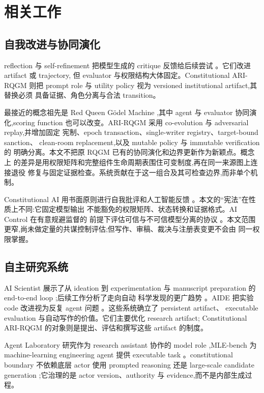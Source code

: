 \section{相关工作}\label{sec:related}

\subsection{自我改进与协同演化}\label{sec:related:treesearch}

reflection 与 self-refinement 把模型生成的 critique 反馈给后续尝试
\cite{madaan2023self,shinn2023reflexion}。它们改进 artifact 或 trajectory,
但 evaluator 与权限结构大体固定。Constitutional ARI-RQGM 则把 prompt
role 与 utility policy 视为 versioned institutional artifact,其替换必须
具备证据、角色分离与合法 transition。

最接近的概念祖先是 Red Queen G\"odel Machine
\cite{iacob2026red},其中 agent 与 evaluator 协同演化,scoring function
也可以改变。ARI-RQGM 采用 co-evolution 与 adversarial replay,并增加固定
宪制、epoch transaction、single-writer registry、target-bound sanction、
clean-room replacement,以及 mutable policy 与 immutable verification 的
明确分离。本文不把原 RQGM 已有的协同演化和边界更新作为新颖点。概念上
的差异是用权限矩阵和完整组件生命周期表围住可变制度,再在同一来源图上连接退役
修复与固定证据检查。系统贡献在于这一组合及其可检查边界,而非单个机制。

Constitutional AI 用书面原则进行自我批评和人工智能反馈
\cite{bai2022constitutional}。本文的“宪法”在性质上不同:它固定模型输出
不能豁免的权限矩阵、状态转换和证据格式。AI Control 在有意规避监督的
前提下评估可信与不可信模型分离的协议 \cite{greenblatt2023ai}。本文范围
更窄,尚未做定量的共谋控制评估;但写作、审稿、裁决与注册表变更不会由
同一权限掌握。

\subsection{自主研究系统}\label{sec:related:autonomous}

AI Scientist 展示了从 ideation 到 experimentation 与 manuscript
preparation 的 end-to-end loop \cite{lu2024ai};后续工作分析了走向自动
科学发现的更广趋势 \cite{lu2026towards}。AIDE 把实验 code 改进视为反复
agent 问题 \cite{jiang2025aide}。这些系统确立了 persistent artifact、
executable evaluation 与自动写作的价值。它们主要优化 research artifact;
Constitutional ARI-RQGM 的对象则是提出、评估和撰写这些 artifact 的制度。

Agent Laboratory 研究作为 research assistant 协作的 model role
\cite{schmidgall2025agent},MLE-bench 为 machine-learning engineering
agent 提供 executable task \cite{chan2024mle}。constitutional boundary
不依赖底层 actor 使用 prompted reasoning \cite{wei2022chain} 还是
large-scale candidate generation \cite{li2022competition};它治理的是
actor version、authority 与 evidence,而不是内部生成过程。

